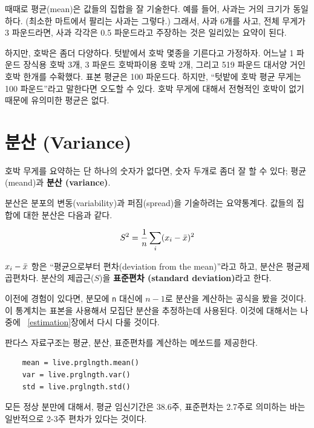때때로 평균(mean)은 값들의 집합을 잘 기술한다. 예를 들어, 사과는 거의 크기가 동일하다. (최소한 마트에서 팔리는 사과는 그렇다.)
그래서, 사과 6개를 사고, 전체 무게가 3 파운드라면, 사과 각각은 0.5 파운드라고 주장하는 것은 일리있는 요약이 된다. 


하지만, 호박은 좀더 다양하다. 텃밭에서 호박 몇종을 기른다고 가정하자.
어느날 1 파운드 장식용 호박 3개, 3 파운드 호박파이용 호박 2개, 그리고 519 파운드 대서양 거인 호박 한개를 수확했다.
표본 평균은 100 파운드다. 하지만, ``텃밭에 호박 평균 무게는 100 파운드''라고 말한다면 오도할 수 있다.
호박 무게에 대해서 전형적인 호박이 없기 때문에 유의미한 평균은 없다.



\section{분산 (Variance)}

호박 무게를 요약하는 단 하나의 숫자가 없다면, 숫자 두개로 좀더 잘 할 수 있다; 평균(meand)과 
{\bf 분산 (variance)}.

분산은 분포의 변동(variability)과 퍼짐(spread)을 기술하려는 요약통계다. 
값들의 집합에 대한 분산은 다음과 같다.

%
\[ S^2 = \frac{1}{n} \sum_i (x_i - \bar{x})^2 \]
%

$x_i - \bar{x}$ 항은 ``평균으로부터 편차(deviation from the mean)''라고 하고,
분산은 평균제곱편차다. 분산의 제곱근($S$)을 {\bf 표준편차 (standard deviation)}라고 한다.

이전에 경험이 있다면, 분모에 {\tt n} 대신에 $n-1$로 분산을 계산하는 공식을 봤을 것이다.
이 통계치는 표본을 사용해서 모집단 분산을 추정하는데 사용된다. 이것에 대해서는 나중에 ~\ref{estimation}장에서 
다시 다룰 것이다.

판다스 자료구조는 평균, 분산, 표준편차를 계산하는 메쏘드를 제공한다.

\begin{verbatim}
    mean = live.prglngth.mean()
    var = live.prglngth.var()
    std = live.prglngth.std()
\end{verbatim}

모든 정상 분만에 대해서, 평균 임신기간은 38.6주, 표준편차는 2.7주로 의미하는 바는 일반적으로 2-3주 편차가 있다는 것이다.

